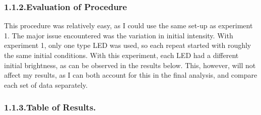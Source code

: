 \documentclass{article}
\begin{document}
\subsubsection{1.1.2.\hspace*{0.5em}Evaluation of Procedure}\label{sec-evaluation-of-procedure}%

\noindent{}This procedure was relatively easy, as I could use the same set-up as experiment 1. The major issue encountered was the variation in initial intensity. With experiment 1, only one type LED was used, so each repeat started with roughly the same initial conditions. With this experiment, each LED had a different initial brightness, as can be observed in the results below. This, however, will not affect my results, as I can both account for this in the final analysis, and compare each set of data separately.%

\subsubsection{1.1.3.\hspace*{0.5em}Table of Results.}\label{sec-table-of-results}%
\end{document}
